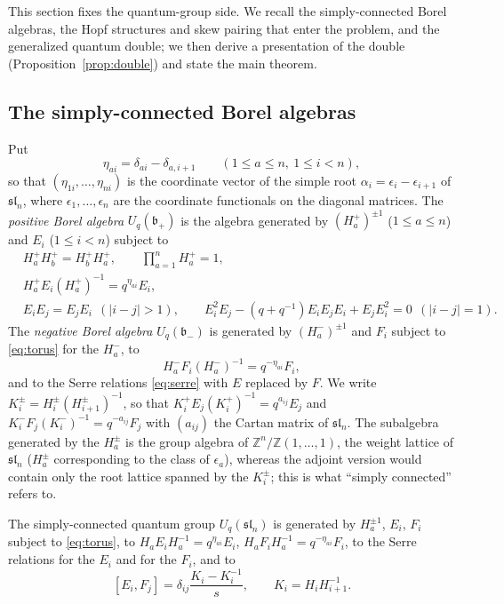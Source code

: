\documentclass[12pt]{article}
\theoremstyle{remark}
\newcommand{\U}{U_q}
\newcommand{\slN}{\mathfrak{sl}_n}
\newcommand{\bp}{\mathfrak b_+}
\newcommand{\bm}{\mathfrak b_-}
\begin{document}
This section fixes the quantum-group side. We recall the
simply-connected Borel algebras, the Hopf structures and skew pairing
that enter the problem, and the generalized quantum double; we then
derive a presentation of the double (Proposition~\ref{prop:double}) and
state the main theorem.

\subsection{The simply-connected Borel algebras}

Put
\[
 \eta_{ai}=\delta_{ai}-\delta_{a,i+1}
 \qquad(1\le a\le n,\ 1\le i<n),
\]
so that $(\eta_{1i},\dots,\eta_{ni})$ is the coordinate vector of the
simple root $\alpha_i=\epsilon_i-\epsilon_{i+1}$ of $\slN$, where
$\epsilon_1,\dots,\epsilon_n$ are the coordinate functionals on the
diagonal matrices. The
\emph{positive Borel algebra} $\U(\bp)$ is the algebra generated by
$(H^+_a)^{\pm1}$ ($1\le a\le n$) and $E_i$ ($1\le i<n$) subject to
\begin{align}
 &H^+_aH^+_b=H^+_bH^+_a,\qquad \textstyle\prod_{a=1}^nH^+_a=1,
 \label{eq:torus}\\
 &H^+_aE_i(H^+_a)^{-1}=q^{\eta_{ai}}E_i, \label{eq:chevalley}\\
 &E_iE_j=E_jE_i\ \ (|i-j|>1),\qquad
 E_i^2E_j-(q+q^{-1})E_iE_jE_i+E_jE_i^2=0\ \ (|i-j|=1).
 \label{eq:serre}
\end{align}
The \emph{negative Borel algebra} $\U(\bm)$ is generated by
$(H^-_a)^{\pm1}$ and $F_i$ subject to \eqref{eq:torus} for the $H^-_a$,
to
\begin{equation}\label{eq:chevalleyminus}
 H^-_aF_i(H^-_a)^{-1}=q^{-\eta_{ai}}F_i,
\end{equation}
and to the Serre relations \eqref{eq:serre} with $E$ replaced by $F$.
We write $K^\pm_i=H^\pm_i(H^\pm_{i+1})^{-1}$, so that
$K^+_iE_j(K^+_i)^{-1}=q^{a_{ij}}E_j$ and
$K^-_iF_j(K^-_i)^{-1}=q^{-a_{ij}}F_j$ with $(a_{ij})$ the Cartan matrix
of $\slN$. The subalgebra
generated by the $H^\pm_a$ is the group algebra of
$\mathbb Z^n/\mathbb Z(1,\dots,1)$, the weight lattice of $\slN$
($H^\pm_a$ corresponding to the class of $\epsilon_a$), whereas the
adjoint version would contain only the root lattice spanned by the
$K^\pm_i$; this is what ``simply connected'' refers to.

The simply-connected quantum group $\U(\slN)$ is generated by
$H_a^{\pm1}$, $E_i$, $F_i$ subject to \eqref{eq:torus}, to
$H_aE_iH_a^{-1}=q^{\eta_{ai}}E_i$, $H_aF_iH_a^{-1}=q^{-\eta_{ai}}F_i$,
to the Serre relations for the $E_i$ and for the $F_i$, and to
\begin{equation}\label{eq:EFsl}
 [E_i,F_j]=\delta_{ij}\frac{K_i-K_i^{-1}}{s},\qquad K_i=H_iH_{i+1}^{-1}.
\end{equation}
\end{document}
